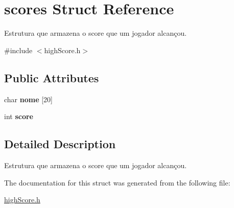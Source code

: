 \hypertarget{structscores}{}\section{scores Struct Reference}
\label{structscores}


Estrutura que armazena o score que um jogador alcançou.  




{\ttfamily \#include $<$high\+Score.\+h$>$}

\subsection*{Public Attributes}
\begin{DoxyCompactItemize}
\item 
char {\bfseries nome} \mbox{[}20\mbox{]}\hypertarget{structscores_a5b7aa6eb9f5173203ea034edda1ff5d9}{}\label{structscores_a5b7aa6eb9f5173203ea034edda1ff5d9}

\item 
int {\bfseries score}\hypertarget{structscores_a1ba70516e189cd401471f37822487a8b}{}\label{structscores_a1ba70516e189cd401471f37822487a8b}

\end{DoxyCompactItemize}


\subsection{Detailed Description}
Estrutura que armazena o score que um jogador alcançou. 

The documentation for this struct was generated from the following file\+:\begin{DoxyCompactItemize}
\item 
\hyperlink{highScore_8h}{high\+Score.\+h}\end{DoxyCompactItemize}
